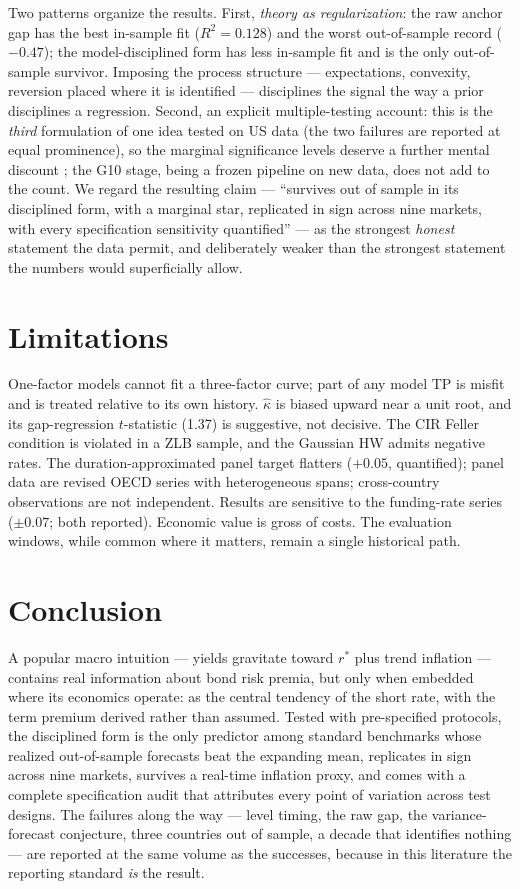 \documentclass[11pt]{article}
\begin{document}
Two patterns organize the results. First, \emph{theory as regularization}: the raw anchor
gap has the best in-sample fit ($R^2=0.128$) and the worst out-of-sample record
($-0.47$); the model-disciplined form has less in-sample fit and is the only out-of-sample
survivor. Imposing the process structure --- expectations, convexity, reversion placed
where it is identified --- disciplines the signal the way a prior disciplines a regression.
Second, an explicit multiple-testing account: this is the \emph{third} formulation of one
idea tested on US data (the two failures are reported at equal prominence), so the
marginal significance levels deserve a further mental discount \citep{harveyliuzhu}; the
G10 stage, being a frozen pipeline on new data, does not add to the count. We regard the
resulting claim --- ``survives out of sample in its disciplined form, with a marginal star,
replicated in sign across nine markets, with every specification sensitivity quantified''
--- as the strongest \emph{honest} statement the data permit, and deliberately weaker than
the strongest statement the numbers would superficially allow.

\section{Limitations}\label{sec:limits}

One-factor models cannot fit a three-factor curve; part of any model TP is misfit and is
treated relative to its own history. $\hat\kappa$ is biased upward near a unit root, and
its gap-regression $t$-statistic (1.37) is suggestive, not decisive. The CIR Feller
condition is violated in a ZLB sample, and the Gaussian HW admits negative rates. The
duration-approximated panel target flatters ($+0.05$, quantified); panel data are revised
OECD series with heterogeneous spans; cross-country observations are not independent.
Results are sensitive to the funding-rate series ($\pm 0.07$; both reported). Economic
value is gross of costs. The evaluation windows, while common where it matters, remain a
single historical path.

\section{Conclusion}\label{sec:concl}

A popular macro intuition --- yields gravitate toward $r^*$ plus trend inflation ---
contains real information about bond risk premia, but only when embedded where its
economics operate: as the central tendency of the short rate, with the term premium
derived rather than assumed. Tested with pre-specified protocols, the disciplined form is
the only predictor among standard benchmarks whose realized out-of-sample forecasts beat
the expanding mean, replicates in sign across nine markets, survives a real-time inflation
proxy, and comes with a complete specification audit that attributes every point of
variation across test designs. The failures along the way --- level timing, the raw gap,
the variance-forecast conjecture, three countries out of sample, a decade that identifies
nothing --- are reported at the same volume as the successes, because in this literature
the reporting standard \emph{is} the result.
\end{document}
